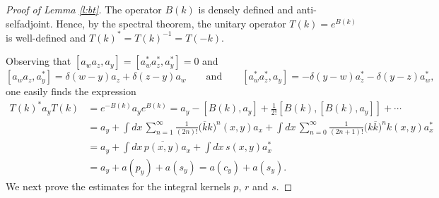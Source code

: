\documentclass[11pt,a4paper,draft,DIV11]{scrartcl}	%
\newcommand{\N}{\mathcal{N}}
\begin{document}
\begin{proof}[Proof of Lemma \ref{l:bt}]
  The operator $B(k)$ is densely defined and anti-selfadjoint.
  Hence, by the spectral theorem, the unitary operator $T(k) = e^{B(k)}$ is
  well-defined and $T(k)^* = T(k)^{-1} = T(-k)$.
\iffalse
  Let $\chi$ be the characteristic function, and consider a real number $M >
  0$. We give a proof of the formulae on the subspace $\chi(\N \le M)
  \mathcal{F}$, and then we indicate how to extend it to the whole
  $\mathcal{F}$. First, note that $B(k)$ and $a(f)$ are bounded operators on
  $\chi(\N \le M) \mathcal{F}$. Recall the formula
  \[
    e^X Y e^{-X} = Y + [X,Y] + \frac{1}{2!} [X,[X,Y]] + \cdots
  \]
\fi

  Observing that $[a_w a_z, a_y] = [a_w^* a_z^*, a_y^*] = 0$ and
  \[
    [a_w a_z, a_y^*] = \delta(w-y) a_z + \delta(z-y) a_w \qquad \text{and}
    \qquad [a_w^* a_z^*, a_y] = -\delta(y-w) a_z^* - \delta(y-z) a_w^*,
  \]
  one easily finds the expression
  \begin{align*}
    T(k)^* a_y T(k) & = e^{-B(k)} a_y e^{B(k)} = a_y - [B(k), a_y] +
    \frac{1}{2!} [B(k), [B(k), a_y]] + \cdots \\
    & = a_y + \int dx \, \sum_{n=1}^\infty \frac{1}{(2n)!} \big( 
    \overline{k} k \big)^n(x,y) a_x + \int dx \, \sum_{n=0}^\infty
    \frac{1}{(2n+1)!} \big( k \overline{k} \big)^n k(x,y) a_x^* \\
    & = a_y + \int dx \, \overline{p(x,y)} a_x + \int dx \, s(x,y) a_x^* \\
    & = a_y + a(p_y) + a(s_y) = a(c_y) + a(s_y).
  \end{align*}
  We next prove the estimates for the integral kernels $p$, $r$ and $s$. 



\end{proof}
\end{document}

